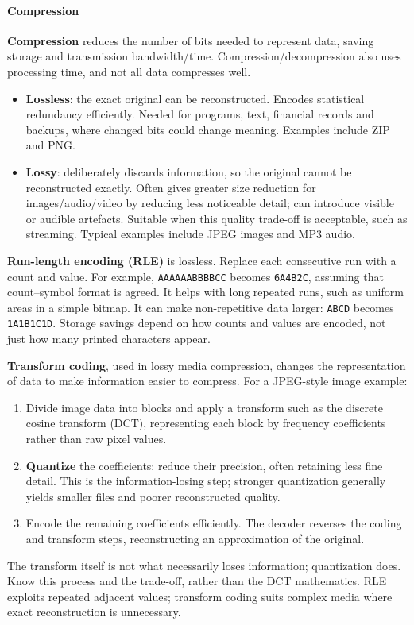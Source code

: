 \documentclass[a4paper,12pt]{article}
\begin{document}
\paragraph{Compression}
\textbf{Compression} reduces the number of bits needed to represent data, saving storage and transmission bandwidth/time. Compression/decompression also uses processing time, and not all data compresses well.
\begin{itemize}
    \item \textbf{Lossless}: the exact original can be reconstructed. Encodes statistical redundancy efficiently. Needed for programs, text, financial records and backups, where changed bits could change meaning. Examples include ZIP and PNG.
    \item \textbf{Lossy}: deliberately discards information, so the original cannot be reconstructed exactly. Often gives greater size reduction for images/audio/video by reducing less noticeable detail; can introduce visible or audible artefacts. Suitable when this quality trade-off is acceptable, such as streaming. Typical examples include JPEG images and MP3 audio.
\end{itemize}
\textbf{Run-length encoding (RLE)} is lossless. Replace each consecutive run with a count and value. For example, \texttt{AAAAAABBBBCC} becomes \texttt{6A4B2C}, assuming that count--symbol format is agreed. It helps with long repeated runs, such as uniform areas in a simple bitmap. It can make non-repetitive data larger: \texttt{ABCD} becomes \texttt{1A1B1C1D}. Storage savings depend on how counts and values are encoded, not just how many printed characters appear.

\textbf{Transform coding}, used in lossy media compression, changes the representation of data to make information easier to compress. For a JPEG-style image example:
\begin{enumerate}
    \item Divide image data into blocks and apply a transform such as the discrete cosine transform (DCT), representing each block by frequency coefficients rather than raw pixel values.
    \item \textbf{Quantize} the coefficients: reduce their precision, often retaining less fine detail. This is the information-losing step; stronger quantization generally yields smaller files and poorer reconstructed quality.
    \item Encode the remaining coefficients efficiently. The decoder reverses the coding and transform steps, reconstructing an approximation of the original.
\end{enumerate}
The transform itself is not what necessarily loses information; quantization does. Know this process and the trade-off, rather than the DCT mathematics. RLE exploits repeated adjacent values; transform coding suits complex media where exact reconstruction is unnecessary.
\end{document}
